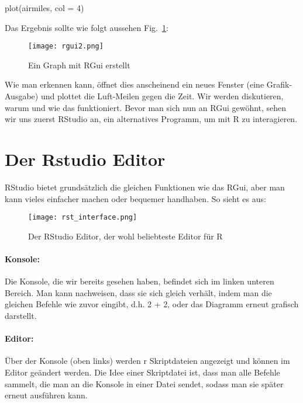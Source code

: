 \documentclass[a4paper,twoside]{tufte-book}\usepackage[]{graphicx}\usepackage[]{color}
\begin{document}
\begin{Anhang}
\begin{Schunk}
\begin{Sinput}
plot(airmiles, col = 4)
\end{Sinput}
\end{Schunk}

Das Ergebnis sollte wie folgt aussehen Fig.~\ref{fig: Rgui2}:

\begin{figure}[]
\begin{center}
\texttt{[image: rgui2.png]}
\caption{Ein Graph mit RGui erstellt}
\label{fig: Rgui2}
\end{center}
\end{figure}

Wie man erkennen kann, öffnet dies anscheinend ein neues Fenster (eine Grafik-Ausgabe) und plottet die Luft-Meilen gegen die Zeit. Wir werden diskutieren, warum und wie das funktioniert. Bevor man sich nun an RGui gewöhnt, sehen wir uns zuerst RStudio an, ein alternatives Programm, um mit R zu interagieren.

\section{Der Rstudio Editor}
 
RStudio bietet grundsätzlich die gleichen Funktionen wie das RGui, aber man kann vieles einfacher machen oder bequemer handhaben. So sieht es aus:

\begin{figure}[]
\begin{center}
\texttt{[image: rst\_interface.png]}
\caption{Der RStudio Editor, der wohl beliebteste Editor für R}
\label{fig: Rstudio}
\end{center}
\end{figure}


\paragraph{Konsole:} Die Konsole, die wir bereits gesehen haben, befindet sich im linken unteren Bereich. Man kann nachweisen, dass sie sich gleich verhält, indem man die gleichen Befehle wie zuvor eingibt, d.h. 2 + 2, oder das Diagramm erneut grafisch darstellt.

\paragraph{Editor:} Über der Konsole (oben links) werden r Skriptdateien angezeigt und können im Editor geändert werden. Die Idee einer Skriptdatei ist, dass man alle Befehle sammelt, die man an die Konsole in einer Datei sendet, sodass man sie später erneut ausführen kann.  


\end{Anhang}
\end{document}
